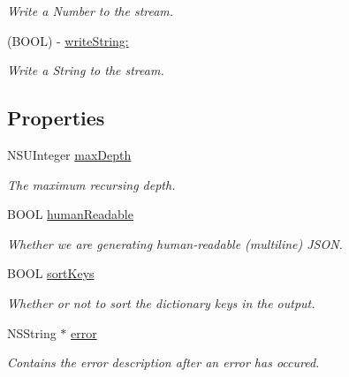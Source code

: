 \begin{DoxyCompactItemize}
\begin{DoxyCompactList}\small\item\em Write a Number to the stream. \item\end{DoxyCompactList}\item 
\hypertarget{interface_s_b_json_stream_writer_a9acd747325bacc643f4830619d4c1139}{
(BOOL) -\/ \hyperlink{interface_s_b_json_stream_writer_a9acd747325bacc643f4830619d4c1139}{writeString:}}
\label{interface_s_b_json_stream_writer_a9acd747325bacc643f4830619d4c1139}

\begin{DoxyCompactList}\small\item\em Write a String to the stream. \item\end{DoxyCompactList}\end{DoxyCompactItemize}
\subsection*{Properties}
\begin{DoxyCompactItemize}
\item 
NSUInteger \hyperlink{interface_s_b_json_stream_writer_a146e7e950ab74a0e766ffd860e454fc9}{maxDepth}
\begin{DoxyCompactList}\small\item\em The maximum recursing depth. \item\end{DoxyCompactList}\item 
BOOL \hyperlink{interface_s_b_json_stream_writer_af43e8bd7170d6128480515f532b7b791}{humanReadable}
\begin{DoxyCompactList}\small\item\em Whether we are generating human-\/readable (multiline) JSON. \item\end{DoxyCompactList}\item 
BOOL \hyperlink{interface_s_b_json_stream_writer_ab206c6844a0fd20307b5dfe881e17bf2}{sortKeys}
\begin{DoxyCompactList}\small\item\em Whether or not to sort the dictionary keys in the output. \item\end{DoxyCompactList}\item 
\hypertarget{interface_s_b_json_stream_writer_af9ad1ac60aaa480f4b4543e42e40fcf2}{
NSString $\ast$ \hyperlink{interface_s_b_json_stream_writer_af9ad1ac60aaa480f4b4543e42e40fcf2}{error}}
\label{interface_s_b_json_stream_writer_af9ad1ac60aaa480f4b4543e42e40fcf2}

\begin{DoxyCompactList}\small\item\em Contains the error description after an error has occured. \item\end{DoxyCompactList}\end{DoxyCompactItemize}


